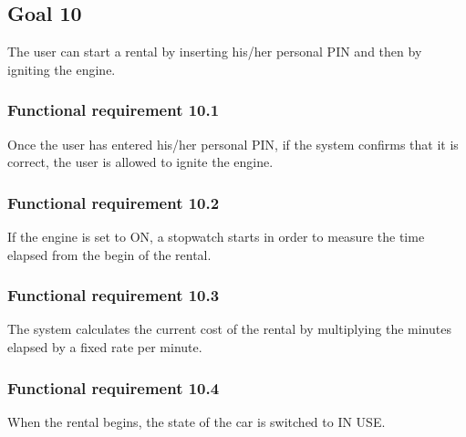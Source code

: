 \subsection{Goal 10}
The user can start a rental by inserting his/her personal PIN and then by igniting the engine.

\setcounter{secnumdepth}{3}
\subsubsection{Functional requirement 10.1}
Once the user has entered his/her personal PIN, if the system confirms that it is correct, the user is allowed to ignite the engine.

\subsubsection{Functional requirement 10.2}
If the engine is set to ON, a stopwatch starts in order to measure the time elapsed from the begin of the rental.

\subsubsection{Functional requirement 10.3}
The system calculates the current cost of the rental by multiplying the minutes elapsed by a fixed rate per minute.

\subsubsection{Functional requirement 10.4}
When the rental begins, the state of the car is switched to IN USE.
